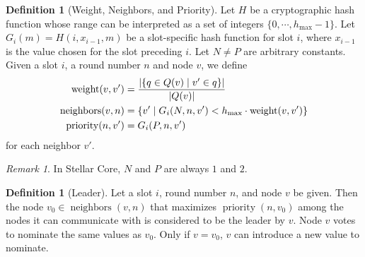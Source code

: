 \documentclass[12pt, psamsfonts]{amsart}
\theoremstyle{definition}
\newtheorem{defn}[thm]{Definition}
\theoremstyle{remark}
\newtheorem{rem}[thm]{Remark}
\DeclareMathOperator{\weight}{weight}
\DeclareMathOperator{\neighbors}{neighbors}
\DeclareMathOperator{\priority}{priority}
\numberwithin{equation}{subsection}
\begin{document}
\begin{defn}[Weight, Neighbors, and Priority]
    Let $H$ be a cryptographic hash function whose range can be interpreted as a set of integers $\{ 0, \cdots, h_{\max} - 1 \}$.
    Let $G_i(m) = H(i, x_{i - 1}, m)$ be a slot-specific hash function for slot $i$, where $x_{i - 1}$ is the value chosen for the slot preceding $i$.
    Let $N \ne P$ are arbitrary constants.
    Given a slot $i$, a round number $n$ and node $v$, we define
    \begin{align*}
        \weight(v, v') &= \frac{\abs{\{ q \in Q(v) \mid v' \in q \}}}{\abs{Q(v)}} \\
        \neighbors(v, n) &= \{ v' \mid G_i(N, n, v') < h_{\max} \cdot \weight(v, v') \} \\
        \priority(n, v') &= G_i(P, n, v')
    \end{align*}
    for each neighbor $v'$.
\end{defn}

\begin{rem}
    In Stellar Core, $N$ and $P$ are always $1$ and $2$.
\end{rem}

\begin{defn}[Leader]
    Let a slot $i$, round number $n$, and node $v$ be given.
    Then the node $v_0 \in \neighbors(v, n)$ that maximizes $\priority(n, v_0)$ among the nodes it can communicate with is considered to be the leader by $v$.
    Node $v$ votes to nominate the same values as $v_0$.
    Only if $v = v_0$, $v$ can introduce a new value to nominate.
\end{defn}
\end{document}
